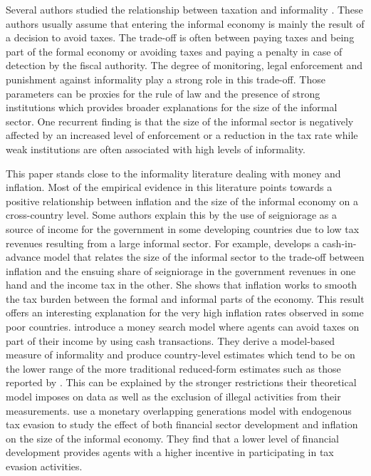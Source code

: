 \documentclass[12pt,a4paper,titlepage]{article}
\begin{document}
Several authors studied the relationship between taxation and informality \citep{Gomis-Porqueras2008, Prado2011, Ihrig2004, Aruoba2010}. These authors usually assume that entering the informal economy is mainly the result of a decision to avoid taxes. The trade-off is often between paying taxes and being part of the formal economy or avoiding taxes and paying a penalty in case of detection by the fiscal authority. The degree of monitoring, legal enforcement and punishment against informality play a strong role in this trade-off. Those parameters can be proxies for the rule of law and the presence of strong institutions which provides broader explanations for the size of the informal sector. One recurrent finding is that the size of the informal sector is negatively affected by an increased level of enforcement or a reduction in the tax rate while weak institutions are often associated with high levels of informality.

This paper stands close to the informality literature dealing with money and inflation. Most of the empirical evidence in this literature points towards a positive relationship between inflation and the size of the informal economy on a cross-country level. Some authors explain this by the use of seigniorage as a source of income for the government in some developing countries due to low tax revenues resulting from a large informal sector. For example, \cite{Koreshkova2006} develops a cash-in-advance model that relates the size of the informal sector to the trade-off between inflation and the ensuing share of seigniorage in the government revenues in one hand and the income tax in the other. She shows that inflation works to smooth the tax burden between the formal and informal parts of the economy. This result offers an interesting explanation for the very high inflation rates observed in some poor countries. \cite{Gomis-Porqueras2014} introduce a money search model where agents can avoid taxes on part of their income by using cash transactions. They derive a model-based measure of informality and produce country-level estimates which tend to be on the lower range of the more traditional reduced-form estimates such as those reported by \cite{Enste2000}. This can be explained by the stronger restrictions their theoretical model imposes on data as well as the exclusion of illegal activities from their measurements. \cite{Bittencourt2014} use a monetary overlapping generations model with endogenous tax evasion to study the effect of both financial sector development and inflation on the size of the informal economy. They find that a lower level of financial development provides agents with a higher incentive in participating in tax evasion activities.
\end{document}
